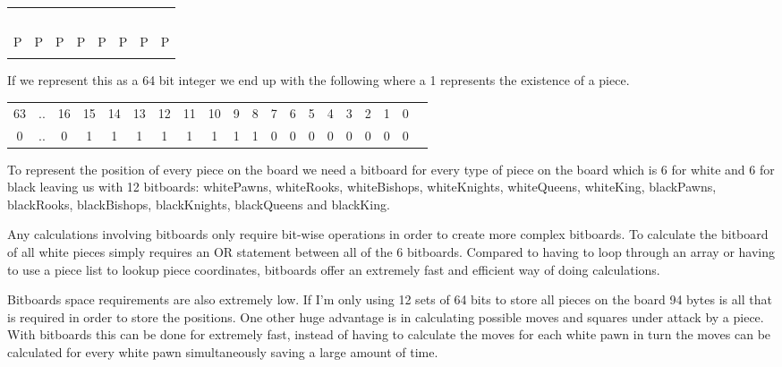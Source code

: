 \documentclass[11pt]{report}
\begin{document}
\begin{table}[H]
\centering
\begin{tabular}{|l|l|l|l|l|l|l|l|}
\hline
  &   &   &   &   &   &   &  \\ \hline
  &   &   &   &   &   &   &  \\ \hline
  &   &   &   &   &   &   &  \\ \hline
  &   &   &   &   &   &   &  \\ \hline
  &   &   &   &   &   &   &  \\ \hline
  &   &   &   &   &   &   &  \\ \hline
P & P & P & P & P & P & P & P \\ \hline
  &   &   &   &   &   &   &  \\ \hline
\end{tabular}
\end{table}

If we represent this as a 64 bit integer we end up with the following where a 1 represents the existence of a piece.
\begin{table}[H]
\begin{tabular}{cccccccccccccccccccc}
63 & .. & 16 & 15 & 14 & 13 & 12 & 11 & 10 & 9 & 8 & 7 & 6 & 5 & 4 & 3 & 2 & 1 & 0 &  \\
0  & .. & 0  & 1  & 1  & 1  & 1  & 1  & 1  & 1 & 1 & 0 & 0 & 0 & 0 & 0 & 0 & 0 & 0 & 
\end{tabular}
\end{table}

To represent the position of every piece on the board we need a bitboard for every type of piece on the board which is 6 for white and 6 for black leaving us with 12 bitboards: whitePawns, whiteRooks, whiteBishops, whiteKnights, whiteQueens, whiteKing, blackPawns, blackRooks, blackBishops, blackKnights, blackQueens and blackKing. \newline

Any calculations involving bitboards only require bit-wise operations in order to create more complex bitboards. To calculate the bitboard of all white pieces simply requires an OR statement between all of the 6 bitboards. Compared to having to loop through an array or having to use a piece list to lookup piece coordinates, bitboards offer an extremely fast and efficient way of doing calculations. \newline

Bitboards space requirements are also extremely low. If I'm only using 12 sets of 64 bits to store all pieces on the board 94 bytes is all that is required in order to store the positions. One other huge advantage is in calculating possible moves and squares under attack by a piece. With bitboards this can be done for extremely fast, instead of having to calculate the moves for each white pawn in turn the moves can be calculated for every white pawn simultaneously saving a large amount of time. \newline
\end{document}
